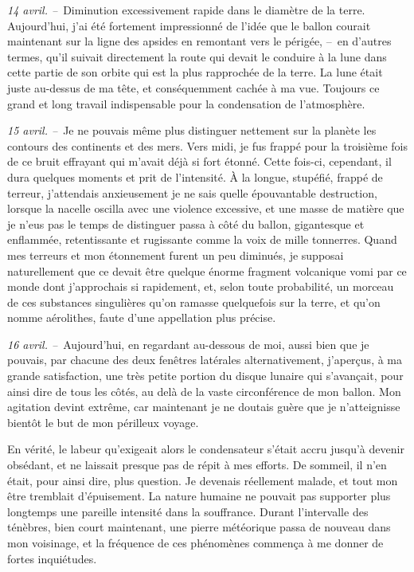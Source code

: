 \documentclass[french,twoside]{book} %
\begin{document}
\emph{14 avril. –} Diminution excessivement rapide dans le diamètre de la terre. Aujourd’hui, j’ai été fortement impressionné de l’idée que le ballon courait maintenant sur la ligne des apsides en remontant vers le périgée, – en d’autres termes, qu’il suivait directement la route qui devait le conduire à la lune dans cette partie de son orbite qui est la plus rapprochée de la terre. La lune était juste au-dessus de ma tête, et conséquemment cachée à ma vue. Toujours ce grand et long travail indispensable pour la condensation de l’atmosphère.\par
\emph{15 avril. –} Je ne pouvais même plus distinguer nettement sur la planète les contours des continents et des mers. Vers midi, je fus frappé pour la troisième fois de ce bruit effrayant qui m’avait déjà si fort étonné. Cette fois-ci, cependant, il dura quelques moments et prit de l’intensité. À la longue, stupéfié, frappé de terreur, j’attendais anxieusement je ne sais quelle épouvantable destruction, lorsque la nacelle oscilla avec une violence excessive, et une masse de matière que je n’eus pas le temps de distinguer passa à côté du ballon, gigantesque et enflammée, retentissante et rugissante comme la voix de mille tonnerres. Quand mes terreurs et mon étonnement furent un peu diminués, je supposai naturellement que ce devait être quelque énorme fragment volcanique vomi par ce monde dont j’approchais si rapidement, et, selon toute probabilité, un morceau de ces substances singulières qu’on ramasse quelquefois sur la terre, et qu’on nomme aérolithes, faute d’une appellation plus précise.\par
\emph{16 avril. –} Aujourd’hui, en regardant au-dessous de moi, aussi bien que je pouvais, par chacune des deux fenêtres latérales alternativement, j’aperçus, à ma grande satisfaction, une très petite portion du disque lunaire qui s’avançait, pour ainsi dire de tous les côtés, au delà de la vaste circonférence de mon ballon. Mon agitation devint extrême, car maintenant je ne doutais guère que je n’atteignisse bientôt le but de mon périlleux voyage.\par
En vérité, le labeur qu’exigeait alors le condensateur s’était accru jusqu’à devenir obsédant, et ne laissait presque pas de répit à mes efforts. De sommeil, il n’en était, pour ainsi dire, plus question. Je devenais réellement malade, et tout mon être tremblait d’épuisement. La nature humaine ne pouvait pas supporter plus longtemps une pareille intensité dans la souffrance. Durant l’intervalle des ténèbres, bien court maintenant, une pierre météorique passa de nouveau dans mon voisinage, et la fréquence de ces phénomènes commença à me donner de fortes inquiétudes.\par
\end{document}
